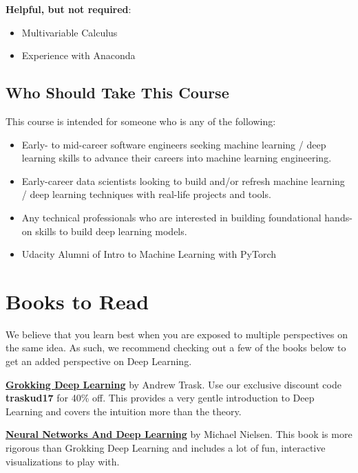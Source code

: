 \textbf{Helpful, but not required}:

\begin{itemize}
    \item Multivariable Calculus
    \item Experience with Anaconda
\end{itemize}

\subsection{Who Should Take This Course}

This course is intended for someone who is any of the following:

\begin{itemize}
    \item Early- to mid-career software engineers seeking machine learning / deep learning skills to advance their careers into machine learning engineering.
    \item Early-career data scientists looking to build and/or refresh machine learning / deep learning techniques with real-life projects and tools.
    \item Any technical professionals who are interested in building foundational hands-on skills to build deep learning models.
    \item Udacity Alumni of Intro to Machine Learning with PyTorch
\end{itemize}


\section{Books to Read}

We believe that you learn best when you are exposed to multiple perspectives on the same idea. As such, we recommend checking out a few of the books below to get an added perspective on Deep Learning.

\href{https://www.manning.com/books/grokking-deep-learning}{\textbf{Grokking Deep Learning}} by Andrew Trask. Use our exclusive discount code \textbf{traskud17} for 40\% off. This provides a very gentle introduction to Deep Learning and covers the intuition more than the theory.

\href{http://neuralnetworksanddeeplearning.com/}{\textbf{Neural Networks And Deep Learning}} by Michael Nielsen. This book is more rigorous than Grokking Deep Learning and includes a lot of fun, interactive visualizations to play with.

